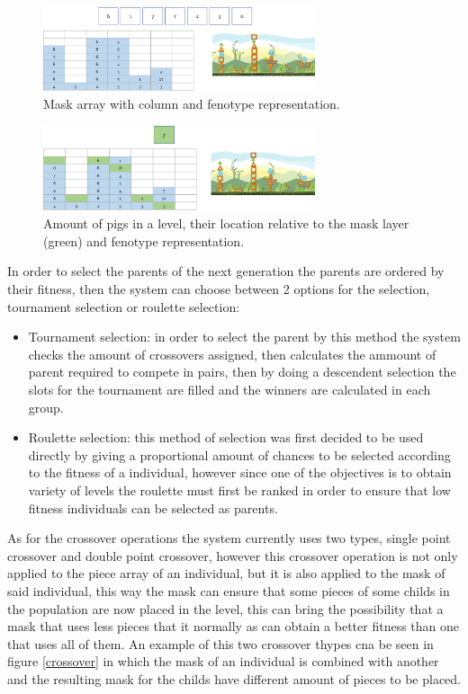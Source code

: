 \documentclass[conference]{IEEEtran}
\begin{document}
\begin{figure}[htbp]
    \centerline{\includegraphics[width=80mm]{Images/mask_layer.png}}
    \caption{Mask array with column and fenotype representation.}
    \label{mask_layer}
\end{figure}

\begin{figure}[htbp]
    \centerline{\includegraphics[width=80mm]{Images/enemy_layer.png}}
    \caption{Amount of pigs in a level, their location relative to the mask layer (green) and fenotype representation.}
    \label{enemy_layer}
\end{figure}

In order to select the parents of the next generation the parents are ordered by
their fitness, then the system can choose between 2 options for the selection,
tournament selection or roulette selection:

\begin{itemize}
    \item Tournament selection: in order to select the parent by this method the
    system checks the amount of crossovers assigned, then calculates the ammount
    of parent required to compete in pairs, then by doing a descendent selection
    the slots for the tournament are filled and the winners are calculated in
    each group.
    \item Roulette selection: this method of selection was first decided to be
    used directly by giving a proportional amount of chances to be selected
    according to the fitness of a individual, however since one of the
    objectives is to obtain variety of levels the roulette must first be ranked
    in order to ensure that low fitness individuals can be selected as parents.
\end{itemize}

As for the crossover operations the system currently uses two types, single
point crossover and double point crossover, however this crossover operation is
not only applied to the piece array of an individual, but it is also applied to
the mask of said individual, this way the mask can ensure that some pieces of
some childs in the population are now placed in the level, this can bring the
possibility that a mask that uses less pieces that it normally as can obtain a
better fitness than one that uses all of them. An example of this two crossover
thypes cna be seen in figure \ref{crossover} in which the mask of an individual
is combined with another and the resulting mask for the childs have different
amount of pieces to be placed.
\end{document}
